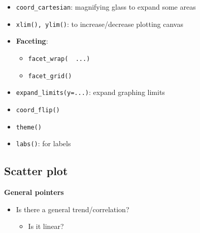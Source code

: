 \documentclass{article}
\begin{document}
\begin{multicols}{2}
\begin{itemize}
\begin{itemize}
	\end{itemize}
	\item \texttt{coord\_cartesian}: magnifying glass to expand some areas
	\item \texttt{xlim(), ylim()}: to increase/decrease plotting canvas
	\item \textbf{Faceting}:
	\begin{itemize}
		\item \texttt{facet\_wrap(~ ...)}
		\item \texttt{facet\_grid()}
	\end{itemize}
	\item \texttt{expand\_limits(y=...)}: expand graphing limits
	\item \texttt{coord\_flip()}
	\item \texttt{theme()}
	\item \texttt{labs()}: for labels
\end{itemize}

\subsection{Scatter plot}
\textbf{General pointers}
\begin{itemize}
	\item Is there a general trend/correlation?
	\begin{itemize}
		\item Is it linear?


\end{itemize}
\end{itemize}
\end{multicols}
\end{document}
